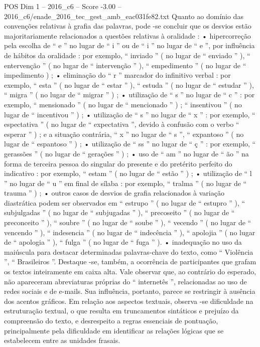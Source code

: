 \begin{textsample}{POS Dim 1 – 2016\_c6 – Score -3.00 – 2016\_c6/enade\_2016\_tec\_gest\_amb\_eac031fe82.txt}
Quanto ao domínio das convenções relativas à grafia das palavras, pode -se concluir que os desvios estão majoritariamente relacionados a questões relativas à oralidade : • hipercorreção pela escolha de “ e ” no lugar de “ i ” ou de “ i ” no lugar de “ e ”, por influência de hábitos da oralidade : por exemplo, “ inviado ” ( no lugar de “ enviado ” ), “ entervenção ” ( no lugar de “ intervenção ” ), “ empedimento ” ( no lugar de “ impedimento ) ; • eliminação do “ r ” marcador do infinitivo verbal : por exemplo, “ esta ” ( no lugar de “ estar ” ), “ estuda ” ( no lugar de “ estudar ” ), “ migra ” ( no lugar de “ migrar ” ) ; • utilização de “ s ” no lugar de “ c ” : por exemplo, “ mensionado ” ( no lugar de “ mencionado ” ) ; “ insentivou ” ( no lugar de “ incentivou ” ) ; • utilização de “ s ” no lugar de “ x ” : por exemplo, “ espectativa ” ( no lugar de “ expectativa ”, devido à confusão com o verbo “ esperar ” ) ; e a situação contrária, “ x ” no lugar de “ s ”, “ expantoso ” ( no lugar de “ espantoso ” ) ; • utilização de “ ss ” no lugar de “ ç ” : por exemplo, “ gerassões ” ( no lugar de “ gerações ” ) ; • uso de “ am ” no lugar de “ ão ” na forma de terceira pessoa do singular do presente e do pretérito perfeito do indicativo : por exemplo, “ estam ” ( no lugar de “ estão ” ) ; • utilização de “ l ” no lugar de “ u ” em final de sílaba : por exemplo, “ tralma ” ( no lugar de “ trauma ” ) ; • outros casos de desvios de grafia relacionados à variação diastrática podem ser observados em “ estrupo ” ( no lugar de “ estupro ” ), “ subjulgadas ” ( no lugar de “ subjugadas ” ), “ precoseito ” ( no lugar de “ preconceito ” ), “ soubre ” ( no lugar de “ soube ” ), “ vecendo ” ( no lugar de “ vencendo ” ), “ indesencia ” ( no lugar de “ indecência ” ), “ apolojia ” ( no lugar de “ apologia ” ), “ fulga ” ( no lugar de “ fuga ” ). • inadequação no uso da maiúscula para destacar determinadas palavras-chave do texto, como “ Violência ”, “ Brasileiros ”.
Destaque -se, também, a ocorrência de participantes que grafam os textos inteiramente em caixa alta.
Vale observar que, ao contrário do esperado, não apareceram abreviaturas próprias do “ internetês ”, relacionadas ao uso de redes sociais e de e-mails.
Sua influência, portanto, parece se restringir à ausência dos acentos gráficos.
Em relação aos aspectos textuais, observa -se dificuldade na estruturação textual, o que resulta em truncamentos sintáticos e prejuízo da compreensão do texto, e desrespeito a regras essenciais de pontuação, principalmente pela dificuldade em identificar as relações lógicas que se estabelecem entre as unidades frasais.

\end{textsample}
